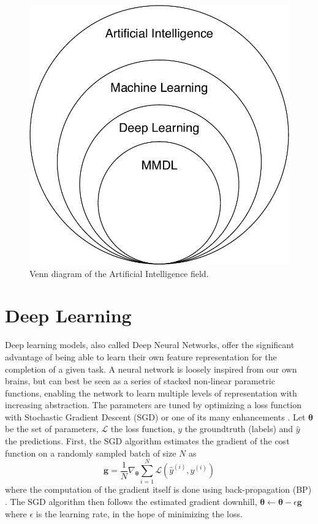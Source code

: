 \begin{figure}[!ht]
\centering
\includegraphics[scale=0.45]{figures/venn}
\caption{Venn diagram of the Artificial Intelligence field.}	
\label{fig:venn-diagram}
\end{figure}


\section{Deep Learning}\label{sec:deep-learning}
Deep learning models, also called Deep Neural Networks, offer the significant advantage of being able to learn their own feature representation for the completion of a given task. A neural network is loosely inspired from our own brains, but can best be seen as a series of stacked non-linear parametric functions, enabling the network to learn multiple levels of representation with increasing abstraction. The parameters are tuned by optimizing a loss function with Stochastic Gradient Descent (SGD) or one of its many enhancements \citep{optim-algos}. Let $\bm{\theta}$ be the set of parameters, $\mathcal{L}$ the loss function, $y$ the groundtruth (labels) and $\hat{y}$ the predictions. First, the SGD algorithm estimates the gradient of the cost function on a randomly sampled batch of size $N$ as
\begin{equation}
\mathbf{g} = \frac{1}{N}\nabla_{\bm{\theta}}\sum_{i=1}^N\mathcal{L}(\hat{y}^{(i)},y^{(i)})
\end{equation}
where the computation of the gradient itself is done using back-propagation (BP) \citep{backprop}. The SGD algorithm then follows the estimated gradient downhill, $\bm{\theta} \leftarrow \bm{\theta} - \epsilon\mathbf{g}$ where $\epsilon$ is the learning rate, in the hope of minimizing the loss.

